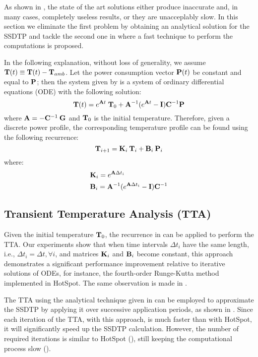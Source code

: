 As shown in , the state of the art solutions either produce inaccurate and, in many cases, completely useless results, or they are unacceplably slow. In this section we eliminate the first problem by obtaining an analytical solution for the SSDTP and tackle the second one in  where a fast technique to perform the computations is proposed.

In the following explanation, without loss of generality, we assume $\mathbf{T}(t) \equiv \mathbf{T}(t) - \mathbf{T}_{amb}$. Let the power consumption vector $\mathbf{P}(t)$ be constant and equal to $\mathbf{P}$; then the system given by  is a system of ordinary differential equations (ODE) with the following solution:
\begin{equation} \label{eq:solution}
  \mathbf{T}(t) = e^{\mathbf{A} t} \; \mathbf{T}_0 + \mathbf{A}^{-1}(e^{\mathbf{A} t} - \mathbf{I})\mathbf{C}^{-1} \mathbf{P}
\end{equation}
where $\mathbf{A} = -\mathbf{C}^{-1} \: \mathbf{G}$ and $\mathbf{T}_0$ is the initial temperature. Therefore, given a discrete power profile, the corresponding temperature profile can be found using the following recurrence:
\begin{equation} \label{eq:recurrent-system}
  \mathbf{T}_{i+1} = \mathbf{K}_i \: \mathbf{T}_i + \mathbf{B}_i \: \mathbf{P}_i
\end{equation}
where:
\begin{align*}
  & \mathbf{K}_i = e^{\mathbf{A} \Delta t_i} \\
  & \mathbf{B}_i = \mathbf{A}^{-1}(e^{\mathbf{A} \Delta t_i} - \mathbf{I})\mathbf{C}^{-1}
\end{align*}

\subsection{Transient Temperature Analysis (TTA)} \label{sec:tta-analytical}
Given the initial temperature $\mathbf{T}_0$, the recurrence in  can be applied to perform the TTA. Our experiments show that when time intervals $\Delta t_i$ have the same length, i.e., $\Delta t_i = \Delta t, \forall i$, and matrices $\mathbf{K}_i$ and $\mathbf{B}_i$ become constant, this approach demonstrates a significant performance improvement relative to iterative solutions of ODEs, for instance, the fourth-order Runge-Kutta method implemented in HotSpot. The same observation is made in \cite{thiele2011}.

The TTA using the analytical technique given in  can be employed to approximate the SSDTP by applying it over successive application periods, as shown in . Since each iteration of the TTA, with this approach, is much faster than with HotSpot, it will significantly speed up the SSDTP calculation. However, the number of required iterations is similar to HotSpot (), still keeping the computational process slow ().


